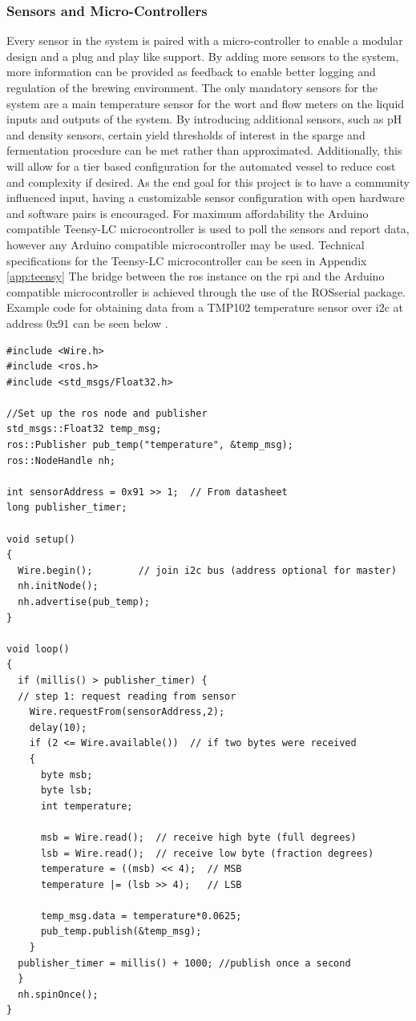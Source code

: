 \documentclass{article}
\begin{document}
\subsubsection{Sensors and Micro-Controllers}\label{subsec:sensor}
Every sensor in the system is paired with a micro-controller to enable a modular design and a plug and play like support.  By adding more sensors to the system, more information can be provided as feedback to enable better logging and regulation of the brewing environment.  The only mandatory sensors for the system are a main temperature sensor for the \gls{wort} and flow meters on the liquid inputs and outputs of the system.  By introducing additional sensors, such as pH and density sensors, certain yield thresholds of interest in the \gls{sparge} and fermentation procedure can be met rather than approximated.  Additionally, this will allow for a tier based configuration for the automated vessel to reduce cost and complexity if desired.  As the end goal for this project is to have a community influenced input, having a customizable sensor configuration with open hardware and software pairs is encouraged.  For maximum affordability the Arduino compatible Teensy-LC microcontroller is used to poll the sensors and report data, however any Arduino compatible microcontroller may be used.  Technical specifications for the Teensy-LC microcontroller can be seen in Appendix \ref{app:teensy}  The bridge between the \gls{ros} instance on the \gls{rpi} and the Arduino compatible microcontroller is achieved through the use of the ROSserial package.  Example code for obtaining data from a TMP102 temperature sensor over \gls{i2c} at address 0x91 \cite{tmp102} can be seen below \cite{rosserial}.

\begin{lstlisting}
#include <Wire.h>
#include <ros.h>
#include <std_msgs/Float32.h>

//Set up the ros node and publisher
std_msgs::Float32 temp_msg;
ros::Publisher pub_temp("temperature", &temp_msg);
ros::NodeHandle nh;

int sensorAddress = 0x91 >> 1;  // From datasheet
long publisher_timer;

void setup()
{
  Wire.begin();        // join i2c bus (address optional for master)
  nh.initNode();
  nh.advertise(pub_temp);
}

void loop()
{
  if (millis() > publisher_timer) {
  // step 1: request reading from sensor
    Wire.requestFrom(sensorAddress,2);
    delay(10);
    if (2 <= Wire.available())  // if two bytes were received
    {
      byte msb;
      byte lsb;
      int temperature;

      msb = Wire.read();  // receive high byte (full degrees)
      lsb = Wire.read();  // receive low byte (fraction degrees)
      temperature = ((msb) << 4);  // MSB
      temperature |= (lsb >> 4);   // LSB

      temp_msg.data = temperature*0.0625;
      pub_temp.publish(&temp_msg);
    }
  publisher_timer = millis() + 1000; //publish once a second
  }
  nh.spinOnce();
}
\end{lstlisting}
\end{document}
